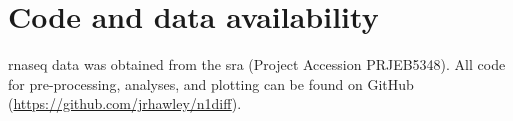 \section{Code and data availability}

\Gls{rnaseq} data was obtained from the \gls{sra} \cite{leinonenSequenceReadArchive2011} (Project Accession PRJEB5348).
All code for pre-processing, analyses, and plotting can be found on GitHub (\url{https://github.com/jrhawley/n1diff}).
